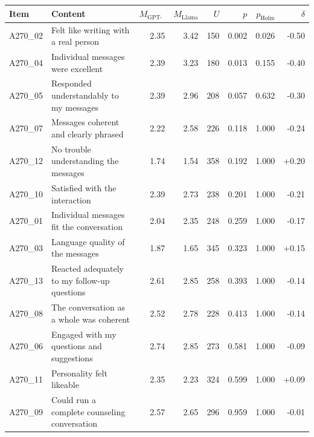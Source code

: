 \begin{tabular}{llrrrrrr}
\toprule
Item & Content & $M_{\text{GPT-OSS}}$ & $M_{\text{Llama}}$ & $U$ & $p$ & $p_{\text{Holm}}$ & $\delta$ \\
\midrule
A270\_02 & Felt like writing with a real person & 2.35 & 3.42 & 150 & 0.002 & 0.026 & -0.50 \\
A270\_04 & Individual messages were excellent & 2.39 & 3.23 & 180 & 0.013 & 0.155 & -0.40 \\
A270\_05 & Responded understandably to my messages & 2.39 & 2.96 & 208 & 0.057 & 0.632 & -0.30 \\
A270\_07 & Messages coherent and clearly phrased & 2.22 & 2.58 & 226 & 0.118 & 1.000 & -0.24 \\
A270\_12 & No trouble understanding the messages & 1.74 & 1.54 & 358 & 0.192 & 1.000 & +0.20 \\
A270\_10 & Satisfied with the interaction & 2.39 & 2.73 & 238 & 0.201 & 1.000 & -0.21 \\
A270\_01 & Individual messages fit the conversation & 2.04 & 2.35 & 248 & 0.259 & 1.000 & -0.17 \\
A270\_03 & Language quality of the messages & 1.87 & 1.65 & 345 & 0.323 & 1.000 & +0.15 \\
A270\_13 & Reacted adequately to my follow-up questions & 2.61 & 2.85 & 258 & 0.393 & 1.000 & -0.14 \\
A270\_08 & The conversation as a whole was coherent & 2.52 & 2.78 & 228 & 0.413 & 1.000 & -0.14 \\
A270\_06 & Engaged with my questions and suggestions & 2.74 & 2.85 & 273 & 0.581 & 1.000 & -0.09 \\
A270\_11 & Personality felt likeable & 2.35 & 2.23 & 324 & 0.599 & 1.000 & +0.09 \\
A270\_09 & Could run a complete counseling conversation & 2.57 & 2.65 & 296 & 0.959 & 1.000 & -0.01 \\
\bottomrule
\end{tabular}
